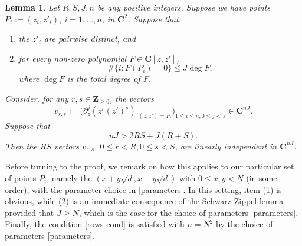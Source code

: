 \documentclass[11pt,reqno]{amsart}
\numberwithin{equation}{section}
\newtheorem{lemma}[theorem]{Lemma}
\newcommand{\Z}{\mathbf{Z}}
\newcommand{\C}{\mathbf{C}}
\renewcommand{\le}{\leqslant}
\renewcommand{\ge}{\geqslant}
\begin{document}
\begin{lemma}\label{lem31}
Let $R, S, J, n$ be any positive integers. Suppose we have points $P_i := (z_i, z'_i)$, $i = 1,\dots, n$, in $\C^2$. Suppose that: 
\begin{enumerate}
    \item the $z'_i$ are pairwise distinct, and
    \item for every non-zero polynomial $F \in \C[z, z']$, 
    \begin{equation}\label{bezout} \# \{ i : F(P_i) = 0 \} \le J \deg F, \end{equation}
where $\deg F$ is the total degree of $F$.
\end{enumerate}
Consider, for any $r, s \in \Z_{\ge 0}$, the vectors
\[ v_{r,s} := \big( \partial_z^j (z^r (z')^s)|_{(z,z') = P_i}\big)_{1 \le i \le n, 0 \le j < J} \in \C^{nJ}.\]
Suppose that 
\begin{equation}\label{rows-cond} nJ  > 2RS + J(R + S).\end{equation} Then the $RS$ vectors $v_{r,s}$, $0 \le r < R, 0 \le s < S$, are linearly independent in $\C^{nJ}$.

\end{lemma}
Before turning to the proof, we remark on how this applies to our particular set of points $P_i$, namely the $(x + y \sqrt{d}, x - y \sqrt{d})$ with $0 \le x, y < N$ (in some order), with the parameter choice in \eqref{parameters}. In this setting, item (1) is obvious, while (2) is an immediate consequence of the Schwarz-Zippel lemma provided that $J \ge N$, which is the case for the choice of parameters \eqref{parameters}. Finally, the condition \eqref{rows-cond} is satisfied with $n = N^2$ by the choice of parameters \eqref{parameters}.
\end{document}
